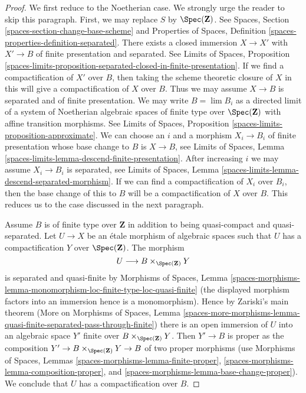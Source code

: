 \begin{proof}
We first reduce to the Noetherian case. We strongly urge the reader
to skip this paragraph. First, we may replace $S$ by $\Spec(\mathbf{Z})$.
See Spaces, Section \ref{spaces-section-change-base-scheme} and
Properties of Spaces, Definition \ref{spaces-properties-definition-separated}.
There exists a closed immersion
$X \to X'$ with $X' \to B$ of finite presentation and separated.
See Limits of Spaces, Proposition
\ref{spaces-limits-proposition-separated-closed-in-finite-presentation}.
If we find a compactification of $X'$ over $B$, then
taking the scheme theoretic closure of $X$ in this will give
a compactification of $X$ over $B$. Thus we may assume
$X \to B$ is separated and of finite presentation.
We may write $B = \lim B_i$ as a directed
limit of a system of Noetherian algebraic spaces
of finite type over $\Spec(\mathbf{Z})$
with affine transition morphisms.
See Limits of Spaces, Proposition \ref{spaces-limits-proposition-approximate}.
We can choose an $i$ and a morphism $X_i \to B_i$ of finite
presentation whose base change to $B$ is $X \to B$, see
Limits of Spaces, Lemma \ref{spaces-limits-lemma-descend-finite-presentation}.
After increasing $i$ we may assume $X_i \to B_i$ is separated, see
Limits of Spaces, Lemma
\ref{spaces-limits-lemma-descend-separated-morphism}.
If we can find a compactification of $X_i$ over $B_i$, then the
base change of this to $B$ will be a compactification of $X$ over $B$.
This reduces us to the case discussed in the next paragraph.

\medskip\noindent
Assume $B$ is of finite type over $\mathbf{Z}$ in addition to being
quasi-compact and quasi-separated. Let $U \to X$ be an \'etale
morphism of algebraic spaces such that $U$ has a compactification
$Y$ over $\Spec(\mathbf{Z})$. The morphism
$$
U \longrightarrow B \times_{\Spec(\mathbf{Z})} Y
$$
is separated and quasi-finite by Morphisms of Spaces, Lemma
\ref{spaces-morphisms-lemma-monomorphism-loc-finite-type-loc-quasi-finite}
(the displayed morphism factors into an immersion hence is a monomorphism).
Hence by Zariski's main theorem (More on Morphisms of Spaces, Lemma
\ref{spaces-more-morphisms-lemma-quasi-finite-separated-pass-through-finite})
there is an open immersion of $U$ into an algebraic space $Y'$
finite over $B \times_{\Spec(\mathbf{Z})} Y$. Then $Y' \to B$ is proper
as the composition $Y' \to B \times_{\Spec(\mathbf{Z})} Y \to B$
of two proper morphisms
(use Morphisms of Spaces, Lemmas \ref{spaces-morphisms-lemma-finite-proper},
\ref{spaces-morphisms-lemma-composition-proper}, and
\ref{spaces-morphisms-lemma-base-change-proper}).
We conclude that $U$ has a compactification over $B$.


\end{proof}
